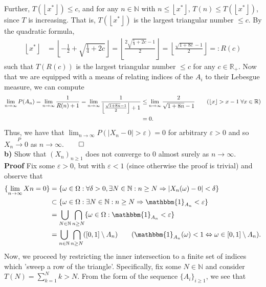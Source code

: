 \documentclass[10pt]{article}
\newcommand{\mbb}[1]{\mathbb{#1}}
\newcommand{\1}[1]{\mathbbm{1}_{#1}}
\newcommand*{\floor}[1]{\left\lfloor#1\right\rfloor}
\begin{document}
    Further, $T(\floor{x^\ast})\leq c$, and for any $n\in\mbb{N}$ with $n\leq\floor{x^\ast}$, $T(n)\leq T(\floor{x^\ast})$, since $T$ is increasing. That is, $T(\floor{x^\ast})$ is the largest triangular number $\leq c$. By the quadratic formula,
    \begin{align*}
        \floor{x^\ast}&=\floor{-\frac{1}{2}+\sqrt{\tfrac{1}{4}+2c}}=\floor{\frac{2\sqrt{\tfrac{1}{4}+2c}-1}{2}}=\floor{\frac{\sqrt{1+8c}-1}{2}}=:R(c)
    \end{align*}
    such that $T(R(c))$ is the largest triangular number $\leq c$ for any $c\in\mbb{R}_+$. Now that we are equipped with a means of relating indices of the $A_i$ to their Lebesgue measure, we can compute
    \begin{align*}
        \lim_{n\rightarrow\infty}P(A_n)=\lim_{n\rightarrow\infty}\frac{1}{R(n)+1}=\lim_{n\rightarrow\infty}\frac{1}{\floor{\frac{\sqrt{1+8n}-1}{2}}+1}&\leq\lim_{n\rightarrow\infty}\frac{2}{\sqrt{1+8n}-1}\tag{$\floor{x}>x-1\;\forall x\in\mbb{R}$}\\
        &=0.
    \end{align*}
    Thus, we have that $\lim_{n\rightarrow\infty}P(|X_n-0|>\varepsilon)=0$ for arbitrary $\varepsilon>0$ and so $X_n\overset{P}{\longrightarrow} 0$ as $n\rightarrow\infty$.\hfill{$\qed$}\\[5pt]
    {\bf b)} Show that $(X_n)_{n\geq 1}$ does not converge to $0$ almost surely as $n\rightarrow\infty$.\\[5pt]
    {\bf Proof}\hspace{5pt} Fix some $\varepsilon>0$, but with $\varepsilon<1$ (since otherwise the proof is trivial) and observe that 
    \begin{align*}
        \{\lim_{n\rightarrow\infty}Xn=0\}&=\{\omega\in\Omega:\forall\delta>0,\exists N\in\mbb{N}:n\geq N\Rightarrow |X_n(\omega)-0|<\delta\}\\
        &\subset\{\omega\in\Omega:\exists N\in\mbb{N}:n\geq N\Rightarrow\1{A_n}<\varepsilon\}\\
        &=\bigcup_{N\in\mbb{N}}\bigcap_{n\geq N}\{\omega\in\Omega:\1{A_n}<\varepsilon\}\\
        &=\bigcup_{n\in\mbb{N}}\bigcap_{n\geq N}([0,1]\setminus A_n)\tag{$\1{A_n}(\omega)<1\Leftrightarrow \omega\in[0,1]\setminus A_n$}.
    \end{align*}
    Now, we proceed by restricting the inner intersection to a finite set of indices which 'sweep a row of the triangle'. Specifically, fix some $N\in\mbb{N}$ and consider $T(N)=\sum_{k=1}^Nk>N$. From the form of the sequence $\{A_i\}_{i\geq 1}$, we see that
\end{document}
